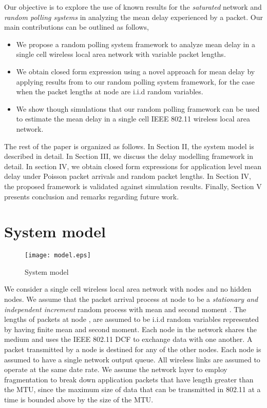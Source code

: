 \documentclass[10pt, conference, compsocconf]{IEEEtran}
\begin{document}
Our objective is to explore the use of known results for the \emph{saturated} network and \emph{random polling systems} in analyzing the mean delay experienced by a packet. Our main contributions can be outlined as follows,
\begin{itemize}
\item We propose a random polling system framework to analyze mean delay in a single cell wireless local area network with variable packet lengths.
\item We obtain closed form expression using a novel approach for mean delay by applying results from \cite{lee} to our random polling system framework, for the case when the packet lengths at node  are i.i.d random variables.
\item We show though simulations that our random polling framework can be used to estimate the mean delay in a single cell IEEE 802.11 wireless local area network.
\end{itemize}

The rest of the paper is organized as follows. In Section II, the system model is described in detail. In Section III, we discuss the delay modelling framework in detail. In section IV,  we obtain closed form expressions for application level mean delay under Poisson packet arrivals and random packet lengths. In Section IV, the proposed framework is validated against simulation results. Finally, Section V presents conclusion and remarks regarding future work.

\section{\large{System model}}
\label{model}
\begin{figure}[h]
\centering
\texttt{[image: model.eps]}
\caption {System model}
\label{fig:model}
\end{figure}

We consider a single cell wireless local area network with  nodes and no hidden nodes. We assume that the packet arrival process at node  to be a \emph{stationary and independent increment} random process  with mean  and second moment . The lengths of packets at node , are assumed to be i.i.d random variables represented by  having finite mean and second moment. Each node in the network shares the medium and uses the IEEE 802.11 DCF to exchange data with one another. A packet transmitted by a node is destined for any of the other nodes. Each node is assumed to have a single network output queue. All wireless links are assumed to operate at the same date rate.
We assume the network layer to employ fragmentation to break down application packets that have length greater than the MTU, since the maximum size of data that can be transmitted in 802.11 at a time is bounded above by the size of the MTU.
\end{document}
